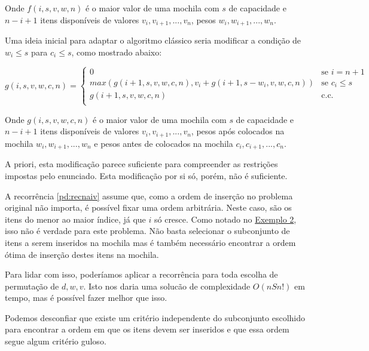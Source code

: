 Onde $f(i, s, v, w, n)$ é o maior valor de uma mochila com $s$ de capacidade e $n - i + 1$ itens disponíveis de valores $v_i, v_{i + 1}, ..., v_n$, pesos $w_i, w_{i + 1}, ..., w_n$.

Uma ideia inicial para adaptar o algoritmo clássico seria modificar a condição de $w_i \leq s$ para $c_i \leq s$, como mostrado abaixo:

\begin{equation} \label{pd:recok}
  g(i, s, v, w, c, n) =
  \begin{cases}
  0                                                                   & \text{se $i = n + 1$} \\
  max(g(i + 1, s, v, w, c, n), v_i + g(i + 1, s - w_i, v, w, c, n))   & \text{se $c_i \leq s$} \\
  g(i + 1, s, v, w, c, n)                                             & \text{c.c.} \\
  \end{cases}
\end{equation}

Onde $g(i, s, v, w, c, n)$ é o maior valor de uma mochila com $s$ de capacidade e $n - i + 1$ itens disponíveis de valores $v_i, v_{i + 1}, ..., v_n$, pesos após colocados na mochila $w_i, w_{i + 1}, ..., w_n$ e pesos antes de colocados na mochila $c_i, c_{i + 1}, ..., c_n$.

A priori, esta modificação parece suficiente para compreender as restrições impostas pelo enunciado. Esta modificação por si só, porém, não é suficiente. 

A recorrência \ref{pd:recnaiv} assume que, como a ordem de inserção no problema original não importa, é possível fixar uma ordem arbitrária. Neste caso, são os itens do menor ao maior índice, já que $i$ só cresce. Como notado no \hyperref[pd:ex2]{Exemplo 2}, isso não é verdade para este problema. Não basta selecionar o subconjunto de itens a serem inseridos na mochila mas é também necessário encontrar a ordem ótima de inserção destes itens na mochila.

Para lidar com isso, poderíamos aplicar a recorrência \label{pd:recnaiv} para toda escolha de permutação de $d, w, v$. Isto nos daria uma solucão de complexidade $O(nSn!)$ em tempo, mas é possível fazer melhor que isso.

Podemos desconfiar que existe um critério independente do subconjunto escolhido para encontrar a ordem em que os itens devem ser inseridos e que essa ordem segue algum critério guloso.

